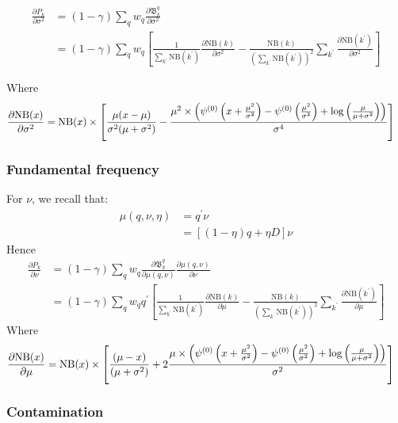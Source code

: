 \documentclass[fleqn,usenatbib]{acmart}
\newcommand{\pdiv}[2]{\frac{\partial #1}{\partial #2}}
\begin{document}
				\begin{align*}
					\pdiv{P_k}{\sigma^2} & = (1-\gamma) \sum_q w_q \pdiv{\mathfrak{B}_k^q}{\sigma^2}
					\\
					& = (1-\gamma) \sum_q w_q \left[ \frac{1}{\sum_{k^\prime} \text{NB}(k^\prime)}  \pdiv{\text{NB}(k)}{\sigma^2} - \frac{\text{NB}(k)}{\left(\sum_{k^\prime} \text{NB}(k^\prime)\right)^2}  \sum_{k^\prime} \pdiv{\text{NB}(k^\prime)}{\sigma^2}\right]
				\end{align*}

				Where
				\begin{align*}
					\pdiv{\text{NB}(x)}{\sigma^2} & = \text{NB}(x) \times \left[ \frac{\mu(x-\mu)}{\sigma^2 (\mu + \sigma^2)} - \frac{\mu^2 \times \left( \dig\left(x+\frac{\mu^2}{\sigma^2}\right) - \dig\left(\frac{\mu^2}{\sigma^2}\right) + \log\left(\frac{\mu}{\mu+\sigma^2}\right) \right)}{\sigma^4} \right]
				\end{align*}

			\subsubsection{Fundamental frequency}

				For $\nu$, we recall that:
				\begin{align}
					\mu(q,\nu,\eta) & = q^\prime \nu
					\\
					& = \left[(1-\eta) q + \eta D\right] \nu 
				\end{align}
				Hence
				\begin{align*}
					\pdiv{P_k}{\nu} & = (1-\gamma) \sum_q w_q \pdiv{\mathfrak{B}_k^q}{\mu(q,\nu)} \pdiv{\mu(q,\nu)}{\nu}
					\\
					& = (1-\gamma) \sum_q w_q q^\prime \left[ \frac{1}{\sum_{k^\prime} \text{NB}(k^\prime)}  \pdiv{\text{NB}(k)}{\mu} - \frac{\text{NB}(k)}{\left(\sum_{k^\prime} \text{NB}(k^\prime)\right)^2}  \sum_{k^\prime} \pdiv{\text{NB}(k^\prime)}{\mu}\right]
				\end{align*}
				Where
				\begin{align*}
					\pdiv{\text{NB}(x)}{\mu} & = \text{NB}(x) \times \left[ \frac{(\mu-x)}{(\mu + \sigma^2)} +2 \frac{\mu \times \left( \dig\left(x+\frac{\mu^2}{\sigma^2}\right) - \dig\left(\frac{\mu^2}{\sigma^2}\right) + \log\left(\frac{\mu}{\mu+\sigma^2}\right) \right)}{\sigma^2} \right]
				\end{align*}

			\subsubsection{Contamination}
\end{document}
